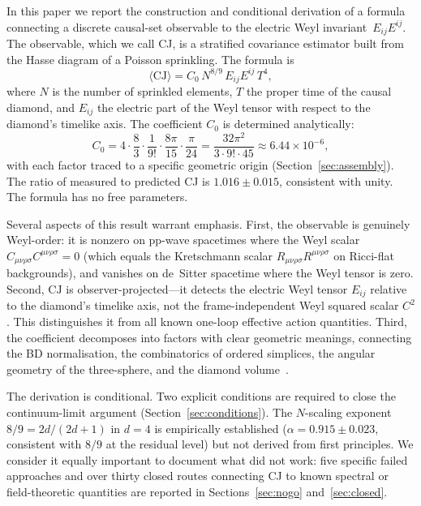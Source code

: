 \documentclass[12pt,a4paper]{article}
\theoremstyle{plain}
\theoremstyle{definition}
\theoremstyle{remark}
\newcommand{\Esq}{E_{ij}E^{ij}}
\newcommand{\CJ}{\mathrm{CJ}}
\begin{document}
In this paper we report the construction and conditional derivation
of a formula connecting a discrete causal-set observable to the
electric Weyl invariant~$\Esq$.  The observable, which we call CJ,
is a stratified covariance estimator built from the Hasse diagram
of a Poisson sprinkling.  The formula is
\begin{equation}\label{eq:bridge-intro}
  \langle \CJ \rangle
  = C_0\, N^{8/9}\, \Esq\, T^4,
\end{equation}
where $N$ is the number of sprinkled elements, $T$ the proper time
of the causal diamond, and $E_{ij}$ the electric part of the Weyl
tensor with respect to the diamond's timelike axis.  The coefficient
$C_0$ is determined analytically:
\begin{equation}\label{eq:C0-intro}
  C_0 = 4 \cdot \frac{8}{3} \cdot \frac{1}{9!}
        \cdot \frac{8\pi}{15} \cdot \frac{\pi}{24}
      = \frac{32\pi^2}{3 \cdot 9! \cdot 45}
      \approx 6.44 \times 10^{-6},
\end{equation}
with each factor traced to a specific geometric origin
(Section~\ref{sec:assembly}).  The ratio of measured to predicted
CJ is $1.016 \pm 0.015$, consistent with unity.  The formula has
no free parameters.

Several aspects of this result warrant emphasis.  First, the
observable is genuinely Weyl-order: it is nonzero on pp-wave
spacetimes where the Weyl scalar $C_{\mu\nu\rho\sigma}
C^{\mu\nu\rho\sigma} = 0$ (which equals the Kretschmann scalar
$R_{\mu\nu\rho\sigma}R^{\mu\nu\rho\sigma}$ on Ricci-flat
backgrounds), and vanishes on de~Sitter spacetime
where the Weyl tensor is zero.  Second, $\CJ$ is
observer-projected---it detects the electric Weyl tensor $E_{ij}$
relative to the diamond's timelike axis, not the frame-independent
Weyl squared scalar $C^2$.  This distinguishes it from all known
one-loop effective action quantities.  Third, the coefficient
decomposes into factors with clear geometric meanings, connecting
the BD normalisation, the combinatorics of ordered simplices,
the angular geometry of the three-sphere, and the diamond
volume~\cite{Poisson:2011}.

The derivation is conditional.  Two explicit conditions are
required to close the continuum-limit argument
(Section~\ref{sec:conditions}).  The $N$-scaling exponent
$8/9 = 2d/(2d+1)$ in $d = 4$ is empirically established
($\alpha = 0.915 \pm 0.023$, consistent with $8/9$ at the
residual level) but not derived from first principles.  We
consider it equally important to document what did not work:
five specific failed approaches and over thirty closed routes
connecting CJ to known spectral or field-theoretic quantities
are reported in Sections~\ref{sec:nogo} and~\ref{sec:closed}.
\end{document}
